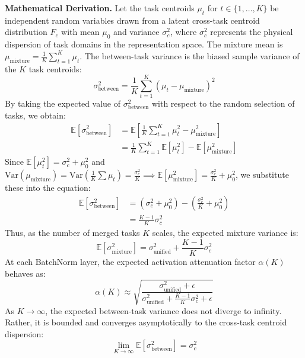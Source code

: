 \documentclass{article}
\theoremstyle{plain}
\theoremstyle{definition}
\theoremstyle{remark}
\begin{document}
\textbf{Mathematical Derivation.}
Let the task centroids $\mu_t$ for $t \in \{1, \dots, K\}$ be independent random variables drawn from a latent cross-task centroid distribution $F_c$ with mean $\mu_0$ and variance $\sigma^2_c$, where $\sigma^2_c$ represents the physical dispersion of task domains in the representation space. The mixture mean is $\mu_{\text{mixture}} = \frac{1}{K} \sum_{t=1}^K \mu_t$. The between-task variance is the biased sample variance of the $K$ task centroids:
\begin{equation}
    \sigma^2_{\text{between}} = \frac{1}{K} \sum_{t=1}^K (\mu_t - \mu_{\text{mixture}})^2
\end{equation}
By taking the expected value of $\sigma^2_{\text{between}}$ with respect to the random selection of tasks, we obtain:
\begin{align}
    \mathbb{E}[\sigma^2_{\text{between}}] &= \mathbb{E}\left[ \frac{1}{K} \sum_{t=1}^K \mu_t^2 - \mu_{\text{mixture}}^2 \right] \nonumber \\
    &= \frac{1}{K} \sum_{t=1}^K \mathbb{E}[\mu_t^2] - \mathbb{E}[\mu_{\text{mixture}}^2]
\end{align}
Since $\mathbb{E}[\mu_t^2] = \sigma^2_c + \mu_0^2$ and $\text{Var}(\mu_{\text{mixture}}) = \text{Var}\left( \frac{1}{K} \sum \mu_t \right) = \frac{\sigma^2_c}{K} \implies \mathbb{E}[\mu_{\text{mixture}}^2] = \frac{\sigma^2_c}{K} + \mu_0^2$, we substitute these into the equation:
\begin{align}
    \mathbb{E}[\sigma^2_{\text{between}}] &= (\sigma^2_c + \mu_0^2) - \left( \frac{\sigma^2_c}{K} + \mu_0^2 \right) \nonumber \\
    &= \frac{K - 1}{K} \sigma^2_c
\end{align}
Thus, as the number of merged tasks $K$ scales, the expected mixture variance is:
\begin{equation}
    \mathbb{E}[\sigma^2_{\text{mixture}}] = \sigma^2_{\text{unified}} + \frac{K - 1}{K} \sigma^2_c
\end{equation}
At each BatchNorm layer, the expected activation attenuation factor $\alpha(K)$ behaves as:
\begin{equation}
    \alpha(K) \approx \sqrt{\frac{\sigma^2_{\text{unified}} + \epsilon}{\sigma^2_{\text{unified}} + \frac{K - 1}{K} \sigma^2_c + \epsilon}}
\end{equation}
As $K \to \infty$, the expected between-task variance does not diverge to infinity. Rather, it is bounded and converges asymptotically to the cross-task centroid dispersion:
\begin{equation}
    \lim_{K \to \infty} \mathbb{E}[\sigma^2_{\text{between}}] = \sigma^2_c
\end{equation}
\end{document}
